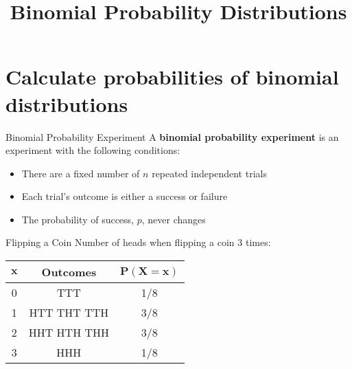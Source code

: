 \documentclass[t]{beamer}
\title{Binomial Probability Distributions}
\author{}
\date{}
\begin{document}
\begin{frame} 
\maketitle
\end{frame}

\section{Calculate probabilities of binomial distributions}

\begin{frame}{Binomial Probability Experiment}
A {\color{blue}\textbf{binomial probability experiment}} is an experiment with the following conditions:
	\begin{itemize}
		\item<2-> There are a fixed number of $n$ repeated independent trials
		\item<3-> Each trial's outcome is either a success or failure
		\item<4-> The probability of success, $p$, never changes
	\end{itemize}
\end{frame}

\begin{frame}{Flipping a Coin}
Number of heads when flipping a coin 3 times:
\begin{center}
\setlength{\extrarowheight}{4pt}
\begin{tabular}{c|c|c}
$\bm{x}$ & Outcomes &$\bm{P(X=x)}$ \\ \hline
0 & TTT & 1/8 \\[4pt]
1 & HTT THT TTH & 3/8 \\[4pt]
2 & HHT HTH THH & 3/8 \\[4pt]
3 & HHH & 1/8	\\[8pt]
\end{tabular}
\end{center}
	\newline\\
\end{frame}
\end{document}
